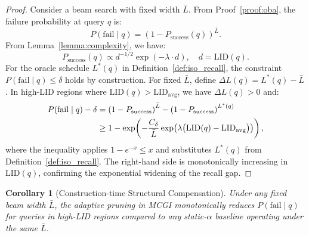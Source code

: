 \documentclass{article}
\theoremstyle{plain}
\newtheorem{corollary}[theorem]{Corollary}
\theoremstyle{definition}
\theoremstyle{remark}
\newcommand{\ours}{MCGI\xspace}
\begin{document}
\begin{proof}
Consider a beam search with fixed width $\bar{L}$. From
Proof~\ref{proof:oba}, the failure probability at query $q$ is:
\begin{equation}
    P(\mathrm{fail} \mid q) = \left(1 - P_{\mathrm{success}}(q)\right)^{\bar{L}}.
\end{equation}
From Lemma~\ref{lemma:complexity}, we have:
\begin{equation}
    P_{\mathrm{success}}(q) \propto
    d^{-1/2} \exp(-\lambda \cdot d),
    \quad d = \mathrm{LID}(q).
\end{equation}
For the oracle schedule $L^*(q)$ in Definition~\ref{def:iso_recall},
the constraint $P(\mathrm{fail} \mid q) \leq \delta$ holds by
construction. For fixed $\bar{L}$, define
$\Delta L(q) = L^*(q) - \bar{L}$. In high-LID regions where
$\mathrm{LID}(q) > \mathrm{LID}_{\mathrm{avg}}$, we have
$\Delta L(q) > 0$ and:
\begin{align}
    P(\mathrm{fail} \mid q) - \delta
    &= \left(1 - P_{\mathrm{success}}\right)^{\bar{L}}
       - \left(1 - P_{\mathrm{success}}\right)^{L^*(q)}
       \notag \\
    &\geq 1 - \exp\!\left(
        -\frac{C_\delta}{\bar{L}}
        \exp\!\left(\lambda\bigl(\mathrm{LID}(q)
        - \mathrm{LID}_{\mathrm{avg}}\bigr)\right)
    \right),
\end{align}
where the inequality applies $1 - e^{-x} \leq x$ and substitutes
$L^*(q)$ from Definition~\ref{def:iso_recall}. The right-hand side
is monotonically increasing in $\mathrm{LID}(q)$, confirming the
exponential widening of the recall gap.
\end{proof}

\begin{corollary}[Construction-time Structural Compensation]
\label{proof:construction_approx}
Under any fixed beam width $\bar{L}$, the adaptive pruning in \ours{} monotonically reduces $P(\mathrm{fail} \mid q)$ for queries in high-LID regions compared to any static-$\alpha$ baseline operating under the same $\bar{L}$.
\end{corollary}
\end{document}

